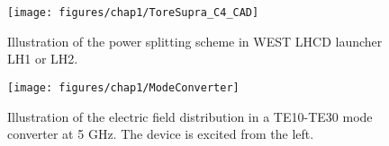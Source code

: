 \begin{figure}
	\centering
	\texttt{[image: figures/chap1/ToreSupra\_C4\_CAD]}
	\caption{Illustration of the power splitting scheme in WEST LHCD launcher LH1 or LH2.}
	\label{fig:toresuprac4cad}
\end{figure}


\begin{figure}
	\centering
	\texttt{[image: figures/chap1/ModeConverter]}
	\caption{Illustration of the electric field distribution in a TE10-TE30 mode converter at 5 GHz. The device is excited from the left.}
	\label{fig:modeconverter}
\end{figure}
